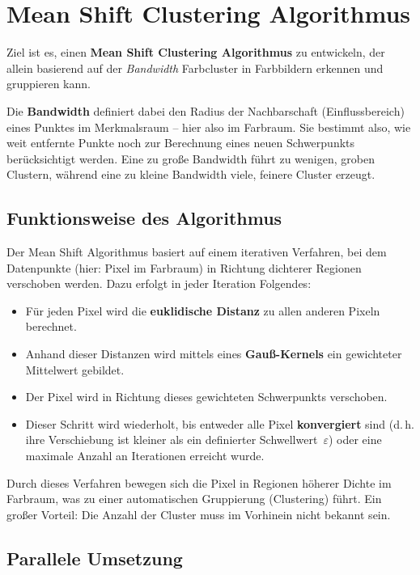 \section{Mean Shift Clustering Algorithmus}

Ziel ist es, einen \textbf{Mean Shift Clustering Algorithmus} zu entwickeln, der allein basierend auf der \textit{Bandwidth} Farbcluster in Farbbildern erkennen und gruppieren kann.

Die \textbf{Bandwidth} definiert dabei den Radius der Nachbarschaft (Einflussbereich) eines Punktes im Merkmalsraum – hier also im Farbraum. Sie bestimmt also, wie weit entfernte Punkte noch zur Berechnung eines neuen Schwerpunkts berücksichtigt werden. Eine zu große Bandwidth führt zu wenigen, groben Clustern, während eine zu kleine Bandwidth viele, feinere Cluster erzeugt.

\subsection*{Funktionsweise des Algorithmus}

Der Mean Shift Algorithmus basiert auf einem iterativen Verfahren, bei dem Datenpunkte (hier: Pixel im Farbraum) in Richtung dichterer Regionen verschoben werden. Dazu erfolgt in jeder Iteration Folgendes:


\begin{itemize}
    \item Für jeden Pixel wird die \textbf{euklidische Distanz} zu allen anderen Pixeln berechnet.
    \item Anhand dieser Distanzen wird mittels eines \textbf{Gauß-Kernels} ein gewichteter Mittelwert gebildet.
    \item Der Pixel wird in Richtung dieses gewichteten Schwerpunkts verschoben.
    \item Dieser Schritt wird wiederholt, bis entweder alle Pixel \textbf{konvergiert} sind (d.\,h. ihre Verschiebung ist kleiner als ein definierter Schwellwert~$\varepsilon$) oder eine maximale Anzahl an Iterationen erreicht wurde.
\end{itemize}

Durch dieses Verfahren bewegen sich die Pixel in Regionen höherer Dichte im Farbraum, was zu einer automatischen Gruppierung (Clustering) führt. Ein großer Vorteil: Die Anzahl der Cluster muss im Vorhinein nicht bekannt sein.

\subsection*{Parallele Umsetzung}

